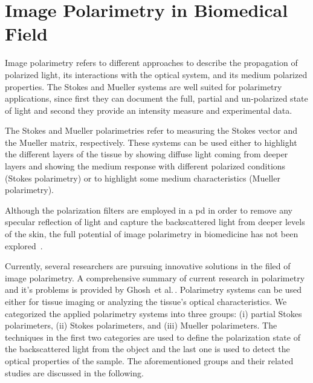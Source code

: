 \section{Image Polarimetry in Biomedical Field} \label{sec:chp4-sec5}
Image polarimetry refers to different approaches to describe the propagation of polarized light, its interactions with the optical system, and its medium polarized properties.
The Stokes and Mueller systems are well suited for polarimetry applications, since first they can document the full, partial and un-polarized state of light and second they provide an intensity measure and experimental data.

The Stokes and Mueller polarimetries refer to measuring the Stokes vector and the Mueller matrix, respectively.
These systems can be used either to highlight the different layers of the tissue by showing diffuse light coming from deeper layers and showing the medium response with different polarized conditions (Stokes polarimetry) or to highlight some medium characteristics (Mueller polarimetry).

Although the polarization filters are employed in a \acf{pd} in order to remove any specular reflection of light and capture the backscattered light from deeper levels of the skin, the full potential of image polarimetry in biomedicine has not been explored~\cite{ghosh2011tissue}.
	
Currently, several researchers are pursuing innovative solutions in the filed of image polarimetry.
A comprehensive summary of current research in polarimetry and it's problems is provided by Ghosh~et al.\,\cite{ghosh2011tissue}.
Polarimetry systems can be used either for tissue imaging or analyzing the tissue's optical characteristics.
We categorized the applied polarimetry systems into three groups: (i) partial Stokes polarimeters, (ii) Stokes polarimeters, and (iii) Mueller polarimeters.
The techniques in the first two categories are used to define the polarization state of the backscattered light from the object and the last one is used to detect the optical properties of the sample.
The aforementioned groups and their related studies are discussed in the following.


